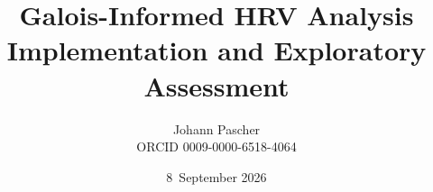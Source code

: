 \documentclass[11pt,a4paper]{report}
\title{Galois-Informed HRV Analysis\\[0.5em]
  \large Implementation and Exploratory Assessment}
\date{8~September 2026}
\author{Johann Pascher\\\small ORCID 0009-0000-6518-4064}
\begin{document}
\renewcommand{\thechapter}{}
\renewcommand{\thesection}{\arabic{section}}
\maketitle
\tableofcontents

\end{document}
